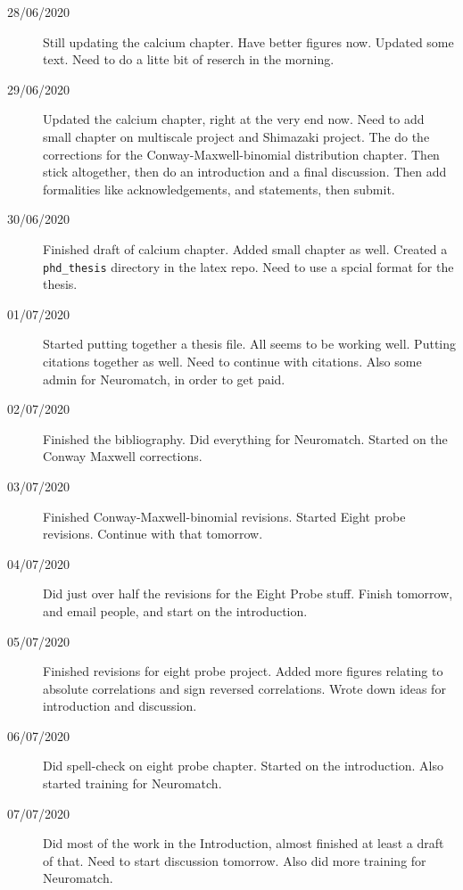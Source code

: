 \documentclass[a4paper,12pt]{article}
\theoremstyle{definition}
\begin{document}
\begin{description}
	\item[28/06/2020] Still updating the calcium chapter. Have better figures now. Updated some text. Need to do a litte bit of reserch in the morning.

	\item[29/06/2020] Updated the calcium chapter, right at the very end now. Need to add small chapter on multiscale project and Shimazaki project. The do the corrections for the Conway-Maxwell-binomial distribution chapter. Then stick altogether, then do an introduction and a final discussion. Then add formalities like acknowledgements, and statements, then submit.

	\item[30/06/2020] Finished draft of calcium chapter. Added small chapter as well. Created a \texttt{phd\_thesis} directory in the latex repo. Need to use a spcial format for the thesis.

	\item[01/07/2020] Started putting together a thesis file. All seems to be working well. Putting citations together as well. Need to continue with citations. Also some admin for Neuromatch, in order to get paid.

	\item[02/07/2020] Finished the bibliography. Did everything for Neuromatch. Started on the Conway Maxwell corrections.

	\item[03/07/2020] Finished Conway-Maxwell-binomial revisions. Started Eight probe revisions. Continue with that tomorrow.

	\item[04/07/2020] Did just over half the revisions for the Eight Probe stuff. Finish tomorrow, and email people, and start on the introduction.

	\item[05/07/2020] Finished revisions for eight probe project. Added more figures relating to absolute correlations and sign reversed correlations. Wrote down ideas for introduction and discussion.

	\item[06/07/2020] Did spell-check on eight probe chapter. Started on the introduction. Also started training for Neuromatch.

	\item[07/07/2020] Did most of the work in the Introduction, almost finished at least a draft of that. Need to start discussion tomorrow. Also did more training for Neuromatch.


\end{description}
\end{document}
